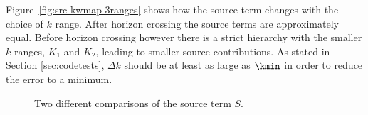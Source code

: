 % 
Figure~\ref{fig:src-kwmap-3ranges} shows how the source term changes
with the choice of $k$ range.  After horizon crossing the source terms
are approximately equal. Before horizon crossing however there is a
strict hierarchy with the smaller $k$ ranges, $K_1$ and $K_2$, leading to
smaller source
contributions.  As stated in Section \ref{sec:codetests}, $\Delta k$
should be at least as large as $\kmin$ in order to reduce the error to
a minimum.
% 
\begin{figure}
% 
\caption{Two different comparisons of the source term $S$.}
\label{fig:src-comparisons}
\end{figure}
% 
% 



